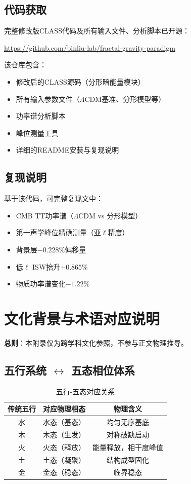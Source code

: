 \documentclass[12pt,a4paper,twocolumn]{article}
\begin{document}
\subsection{代码获取}
完整修改版CLASS代码及所有输入文件、分析脚本已开源：

\url{https://github.com/binliu-lab/fractal-gravity-paradigm}

该仓库包含：
\begin{itemize}
\item 修改后的CLASS源码（分形暗能量模块）
\item 所有输入参数文件（$\Lambda$CDM基准、分形模型等）
\item 功率谱分析脚本
\item 峰位测量工具
\item 详细的README安装与复现说明
\end{itemize}

\subsection{复现说明}
基于该代码，可完整复现文中：
\begin{itemize}
\item CMB TT功率谱（$\Lambda$CDM vs 分形模型）
\item 第一声学峰位精确测量（亚$\ell$精度）
\item 背景层$-0.228\%$偏移量
\item 低$\ell$ ISW抬升$+0.865\%$
\item 物质功率谱变化$-1.22\%$
\end{itemize}

\section{文化背景与术语对应说明}
\label{app:culture}

\textbf{总则}：本附录仅为跨学科文化参照，不参与正文物理推导。

\subsection{五行系统 $\leftrightarrow$ 五态相位体系}
\begin{table}[H]
\centering
\footnotesize
\caption{五行-五态对应关系}
\begin{tabular}{c|c|c}
\hline
\textbf{传统五行} & \textbf{对应物理相态} & \textbf{物理含义} \\
\hline
水 & 水态（基态） & 均匀无序基底 \\
木 & 木态（生发） & 对称破缺启动 \\
火 & 火态（释放） & 能量释放，相干度峰值 \\
土 & 土态（凝聚） & 结构成型固化 \\
金 & 金态（稳态） & 临界稳态 \\
\hline
\end{tabular}
\end{table}
\end{document}
